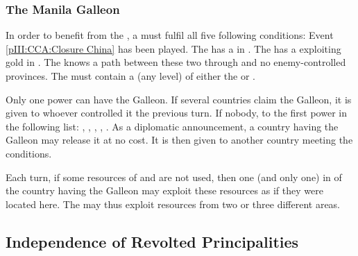 \subsubsection{The Manila Galleon}\label{chSpecific:Manila Galleon}
\aparag In order to benefit from the , a \MAJ must
fulfil all five following conditions:
\bparag Event \ref{pIII:CCA:Closure China} has been played.
\bparag The \MAJ has a \COL in \granderegionPhilippines.
\bparag The \MAJ has a \COL exploiting gold in .
\bparag The \MAJ knows a path between these two \COL through
 and no enemy-controlled provinces.
\bparag The  must contain a \TradeFLEET (any level) of either the
\MAJ or \paysChine.

\aparag Only one power can have the Galleon. If several countries claim the
Galleon, it is given to whoever controlled it the previous turn. If nobody, to
the first power in the following list: \HIS, \POR, \HOL, \ANG, \FRA.
\bparag As a diplomatic announcement, a country having the Galleon may release
it at no cost. It is then given to another country meeting the conditions.

\aparag Each turn, if some resources of \granderegionNankin and
\granderegionCanton are not used, then one (and only one) \COL in
\granderegionPhilippines of the country having the Galleon may exploit these
resources as if they were located here.
\bparag The \COL may thus exploit resources from two or three different areas.



\subsection{Independence of Revolted
  Principalities}\label{chSpecific:Peace:Independence Revolt}

